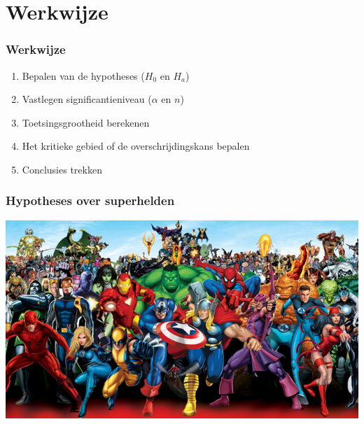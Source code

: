 \documentclass{beamer}
\begin{document}
\section{Werkwijze}

\sectionframelogo{}

\begin{frame}
  \frametitle{Werkwijze}

  \begin{enumerate}
    \item Bepalen van de hypotheses ($H_0$ en $H_a$)
    \item Vastlegen significantieniveau ($\alpha$ en $n$)
    \item Toetsingsgrootheid berekenen
    \item Het kritieke gebied of de overschrijdingskans bepalen
    \item Conclusies trekken
  \end{enumerate}
\end{frame}

\begin{frame}
  \frametitle{Hypotheses over superhelden}

  \includegraphics[width=\textwidth]{img/les5-heroes}
\end{frame}
\end{document}
